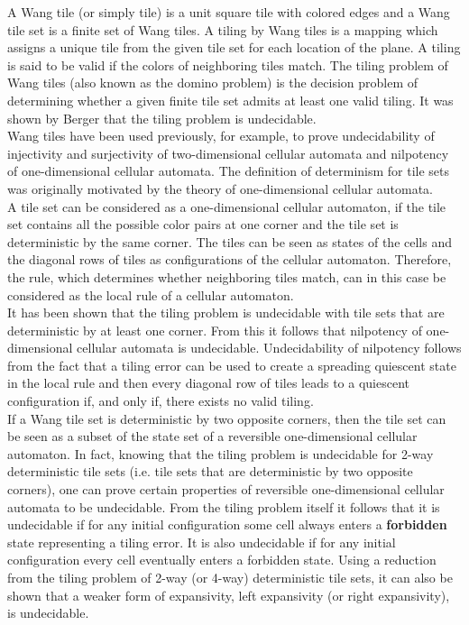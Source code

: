 \documentclass[
	12pt, %
]{fphw}
\begin{document}
A Wang tile (or simply tile) is a unit square tile with colored edges and a Wang tile set is a finite set of Wang tiles. A tiling by Wang tiles is a mapping which assigns a unique tile from the given tile set for each location of the plane. A tiling is said to be valid if the colors of neighboring tiles match. The tiling problem of Wang tiles (also known as the domino problem) is the decision problem of determining whether a given finite tile set admits at least one valid tiling. It was shown by Berger that the tiling problem is undecidable.\\

Wang tiles have been used previously, for example, to prove undecidability of injectivity and surjectivity of two-dimensional cellular automata and nilpotency of one-dimensional cellular automata. The definition of determinism for tile sets was originally motivated by the theory of one-dimensional cellular automata.\\

A tile set can be considered as a one-dimensional cellular automaton, if the tile set contains all the possible color pairs at one corner and the tile set is deterministic by the same corner. The tiles can be seen as states of the cells and the diagonal rows of tiles as configurations of the cellular automaton. Therefore, the rule, which determines whether neighboring tiles match, can in this case be considered as the local rule of a cellular automaton.\\

It has been shown that the tiling problem is undecidable with tile sets that are deterministic by at least one corner. From this it follows that nilpotency of one-dimensional cellular automata is undecidable. Undecidability of nilpotency follows from the fact that a tiling error can be used to create a spreading quiescent state in the local rule and then every diagonal row of tiles leads to a quiescent configuration if, and only if, there exists no valid tiling.\\

If a Wang tile set is deterministic by two opposite corners, then the tile set can be seen as a subset of the state set of a reversible one-dimensional cellular automaton. In fact, knowing that the tiling problem is undecidable for 2-way deterministic tile sets (i.e. tile sets that are deterministic by two opposite corners), one can prove certain properties of reversible one-dimensional cellular automata to be undecidable. From the tiling problem itself it follows that it is undecidable if for any initial configuration some cell always enters a \textbf{forbidden} state representing a tiling error. It is also undecidable if for any initial configuration every cell eventually enters a forbidden state. Using a reduction from the tiling problem of 2-way (or 4-way) deterministic tile sets, it can also be shown that a weaker form of expansivity, left expansivity (or right expansivity), is undecidable.
\end{document}
